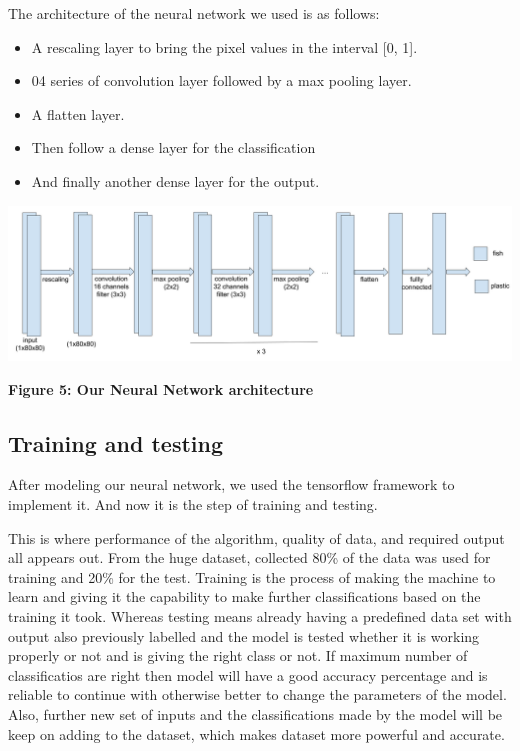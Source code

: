 \documentclass[a4paper, 12pt]{report}
\begin{document}
The architecture of the neural network we used is as follows:


\begin{itemize}

    \item A rescaling layer to bring the pixel values in the interval [0, 1].

    \item 04 series of convolution layer followed by a max pooling layer.

    \item A flatten layer.

    \item Then follow a dense layer for the classification
    
    \item And finally another dense layer for the output.

\end{itemize}

\begin{center}

    \includegraphics[height = 0.36 \linewidth]{our_nn_architecture.png}


    \textbf{Figure 5: Our Neural Network architecture }

\end{center}

\subsection{Training and testing}

After modeling our neural network, we used the tensorflow framework to implement it. And now it is the step of training and testing.

This is where performance of the algorithm, quality of data, and required output all appears out. From the huge dataset, collected 80\% of the data was used for training and 20\% for the test. Training is the process of making the machine to learn and giving it the capability to make further classifications based on the training it took. Whereas testing means already having a predefined data set with output also previously labelled and the model is tested whether it is working properly or not and is giving the right class or not. If maximum number of classificatios are right then model will have a good accuracy percentage and is reliable to continue with otherwise better to change the parameters of the model. Also, further new set of inputs and the classifications made by the model will be keep on adding to the dataset, which makes dataset more powerful and accurate. 
\end{document}
